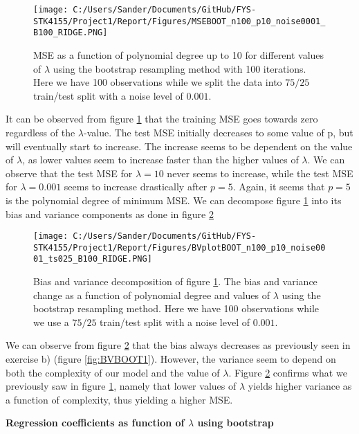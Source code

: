\documentclass[12pt,a4paper]{article}
\begin{document}
\begin{figure}[H]
\centering
\texttt{[image: C:/Users/Sander/Documents/GitHub/FYS-STK4155/Project1/Report/Figures/MSEBOOT\_n100\_p10\_noise0001\_B100\_RIDGE.PNG]}
\caption{\label{fig:MSERidgeBoot3} MSE as a function of polynomial degree up to 10 for different values of $\lambda$ using the bootstrap resampling method with 100 iterations. Here we have 100 observations while we split the data into $75/25$ train/test split with a noise level of $0.001$.}
\end{figure}

\noindent It can be observed from figure \ref{fig:MSERidgeBoot3} that the training MSE goes towards zero regardless of the $\lambda$-value. The test MSE initially decreases to some value of p, but will eventually start to increase. The increase seems to be dependent on the value of $\lambda$, as lower values seem to increase faster than the higher values of $\lambda$. We can observe that the test MSE for $\lambda = 10$ never seems to increase, while the test MSE for $\lambda = 0.001$ seems to increase drastically after $p = 5$. Again, it seems that $p = 5$ is the polynomial degree of minimum MSE. We can decompose figure \ref{fig:MSERidgeBoot3} into its bias and variance components as done in figure \ref{fig:BVRidge1}

\begin{figure}[H]
\centering
\texttt{[image: C:/Users/Sander/Documents/GitHub/FYS-STK4155/Project1/Report/Figures/BVplotBOOT\_n100\_p10\_noise0001\_ts025\_B100\_RIDGE.PNG]}
\caption{\label{fig:BVRidge1} Bias and variance decomposition of figure \ref{fig:MSERidgeBoot3}. The bias and variance change as a function of polynomial degree and values of $\lambda$ using the bootstrap resampling method. Here we have 100 observations while we use a $75/25$ train/test split with a noise level of $0.001$.}
\end{figure}

\noindent We can observe from figure \ref{fig:BVRidge1} that the bias always decreases as previously seen in exercise b) (figure \ref{fig:BVBOOT1}). However, the variance seem to depend on both the complexity of our model and the value of $\lambda$. Figure \ref{fig:BVRidge1} confirms what we previously saw in figure \ref{fig:MSERidgeBoot3}, namely that lower values of $\lambda$ yields higher variance as a function of complexity, thus yielding a higher MSE.

\begin{center}
\large{\textbf{Regression coefficients as function of $\lambda$ using bootstrap}}
\end{center}
\end{document}
